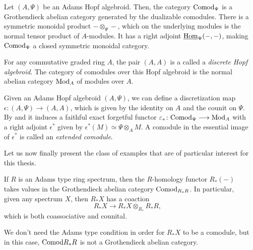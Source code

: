 \begin{proposition}
    \label{ch0:prop:comod-is-sm-grothendieck}
    Let $(A,\Psi)$ be an Adams Hopf algebroid. Then, the category $\mathrm{Comod}_\Psi$ is a Grothendieck abelian category generated by the dualizable comodules. There is a symmetric monoidal product $-\otimes_\Psi -$, which on the underlying modules is the normal tensor product of $A$-modules. It has a right adjoint $\operatorname{\underline{Hom}}_\Psi(-,-)$, making $\mathrm{Comod}_\Psi$ a closed symmetric monoidal category. 
\end{proposition}

\begin{example}
    \label{ch0:ex:modules-as-discrete-Hopf-algebroids}
    For any commutative graded ring $A$, the pair $(A, A)$ is a called a \emph{discrete Hopf algebroid}. The category of comodules over this Hopf algebroid is the normal abelian category $\mathrm{Mod}_A$ of modules over $A$. 
\end{example}

\begin{construction}
    Given an Adams Hopf algebroid $(A, \Psi)$, we can define a discretization map $\epsilon\colon (A, \Psi)\longrightarrow (A, A)$, which is given by the identity on $A$ and the counit on $\Psi$. By \cite[A1.2.1]{ravenel_86} and \cite[4.6]{barthel-heard-valenzuela_2018} it induces a faithful exact forgetful functor $\varepsilon_* \colon \mathrm{Comod}_\Psi \longrightarrow \mathrm{Mod}_A$ with a right adjoint $\epsilon^*$ given by $\epsilon^*(M)\simeq \Psi\otimes_A M$. A comodule in the essential image of $\epsilon^*$ is called an \emph{extended comodule}.
\end{construction}

Let us now finally present the class of examples that are of particular interest for this thesis. 

\begin{example}
    If $R$ is an Adams type ring spectrum, then the $R$-homology functor $R_*(-)$ takes values in the Grothendieck abelian category $\mathrm{Comod}_{R_*R}$. In particular, given any spectrum $X$, then $R_*X$ has a coaction 
    \[R_*X \to R_*X \otimes_{R_*} R_*R,\]
    which is both coassociative and counital.
\end{example}

\begin{remark}
    We don't need the Adams type condition in order for $R_*X$ to be a comodule, but in this case, $\mathrm{Comod}{R_*R}$ is not a Grothendieck abelian category.
\end{remark}

